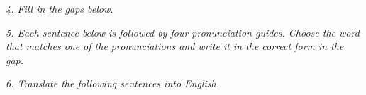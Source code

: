\documentclass{exam}
\begin{document}
\noindent \textit{4. Fill in the gaps below.}

%
%
%
%
%
%
%
%
%
%
%
%
%
%
%
%
%
%
%
%

\noindent \textit{5. Each sentence below is followed by four pronunciation guides. Choose the word that matches one of the pronunciations and write it in the correct form in the gap.}

%
%
%
%
%
%
%
%
%
%
%
%
%
%
%
%
%
%
%
%




 \noindent \textit{6. Translate the following sentences into English.}

\begin{CJK*}{UTF8}{gbsn}
%
%
%
%
%
%
%
%
%
%
%
%
%
%
%
%
%
%
%
%
\end{CJK*}
\end{document}
